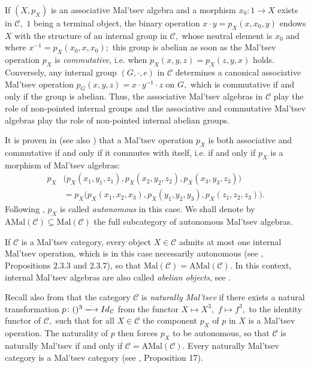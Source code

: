 \documentclass[11pt]{amsart}
\theoremstyle{plain}
\theoremstyle{definition}
\theoremstyle{remark}
\begin{document}
If $(X,p_X)$ is an associative Mal'tsev algebra and a morphism $x_0\colon1\rightarrow X$ exists in $\mathcal{C},$ $1$ being a terminal object, the binary operation $x\cdot y=p_X(x,x_0,y)$ endows $X$ with the structure of an internal group in $\mathcal{C},$ whose neutral element is $x_0$ and where $x^{-1}=p_X(x_0,x,x_0);$ this group is abelian as soon as the Mal'tsev operation $p_X$ is \emph{commutative}, i.e. when $p_X(x,y,z)=p_X(z,y,x)$ holds. Conversely, any internal group $(G,\cdot,e)$ in $\mathcal{C}$ determines a canonical associative Mal'tsev operation $p_G(x,y,z)=x\cdot y^{-1}\cdot z$ on $G,$ which is commutative if and only if the group is abelian. Thus, the associative Mal'tsev algebras in $\mathcal{C}$ play the role of non-pointed internal groups and the associative and commutative Mal'tsev algebras play the role of non-pointed internal abelian groups.

It is proven in \cite{baer-sums} (see also \cite{johnstone}) that a Mal'tsev operation $p_X$ is both associative and commutative if and only if it commutes with itself, i.e. if and only if $p_X$ is a morphism of Mal'tsev algebras:
\begin{equation*}
\begin{split}
p_X&\big(p_X(x_1,y_1,z_1),p_X(x_2,y_2,z_2),p_X(x_3,y_3,z_3)\big)\\&=p_X\big(p_X(x_1,x_2,x_3),p_X(y_1,y_2,y_3),p_X(z_1,z_2,z_3)\big).
\end{split}
\end{equation*}
Following \cite{linton}, $p_X$ is called \emph{autonomous} in this case. We shall denote by $\mathrm{AMal}(\mathcal{C})\subseteq\mathrm{Mal}(\mathcal{C})$ the full subcategory of autonomous Mal'tsev algebras.

If $\mathcal{C}$ is a Mal'tsev \cite{carboni} category, every object $X\in\mathcal{C}$ admits at most one internal Mal'tsev operation, which is in this case necessarily autonomous (see \cite{borceux-bourn}, Propositions $2.3.3$ and $2.3.7$), so that $\mathrm{Mal}(\mathcal{C})=\mathrm{AMal}(\mathcal{C}).$ In this context, internal Mal'tsev algebras are also called \emph{abelian objects}, see \cite{bourn-abelian}.

Recall also from \cite{johnstone} that the category $\mathcal{C}$ is \emph{naturally Mal'tsev} if there exists a natural transformation $p\colon()^3\xlongrightarrow{\cdot} Id_{\mathcal{C}}$ from the functor $X\mapsto X^3,$ $f\mapsto f^3,$ to the identity functor of $\mathcal{C},$ such that for all $X\in\mathcal{C}$ the component $p_X$ of $p$ in $X$ is a Mal'tsev operation. The naturality of $p$ then forces $p_X$ to be autonomous, so that $\mathcal{C}$ is naturally Mal'tsev if and only if $\mathcal{C}=\mathrm{AMal}(\mathcal{C}).$ Every naturally Mal'tsev category is a Mal'tsev category (see \cite{bourn96}, Proposition 17).
\end{document}
